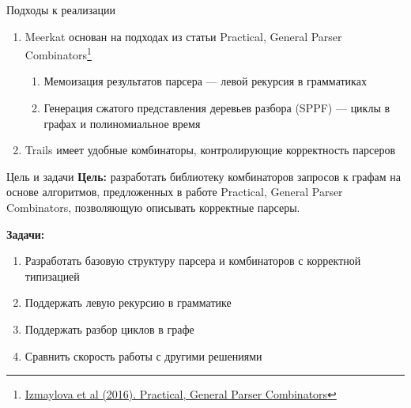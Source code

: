 \documentclass[aspectratio=169]{beamer}
\begin{document}

\begin{frame}{Подходы к реализации}
  \begin{enumerate}
    \item Meerkat основан на подходах из статьи Practical, General Parser Combinators\footnote[1]{\href{https://dl.acm.org/doi/10.1145/2847538.2847539}
            {Izmaylova et al (2016). Practical, General Parser Combinators}}
          \begin{enumerate}
            \item Мемоизация результатов парсера --- левой рекурсия в грамматиках
            \item Генерация сжатого представления деревьев разбора (SPPF) --- циклы в графах и полиномиальное время
          \end{enumerate}
    \item Trails имеет удобные комбинаторы, контролирующие корректность парсеров
  \end{enumerate}
\end{frame}




\begin{frame}{Цель и задачи}
  \textbf{Цель:} разработать библиотеку комбинаторов запросов к графам на основе алгоритмов, предложенных в работе Practical, General Parser Combinators, позволяющую описывать корректные парсеры.

  \textbf{Задачи:}
  \begin{enumerate}
    \item Разработать базовую структуру парсера и комбинаторов с корректной типизацией
    \item Поддержать левую рекурсию в грамматике
    \item Поддержать разбор циклов в графе
    \item Сравнить скорость работы с другими решениями
  \end{enumerate}
\end{frame}
\end{document}

